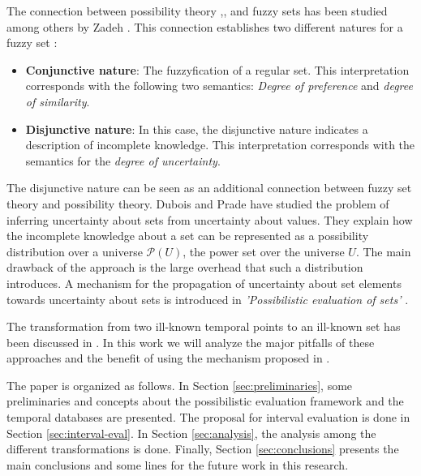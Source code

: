 \documentclass[twoside,twocolumn,a4paper]{article}
\newcommand{\Pow}{\mathcal{P}}
\begin{document}
The connection between possibility theory \cite{Zadeh78},\cite{Shackle61},\cite{Gaines75} and fuzzy sets has been studied among others by Zadeh \cite{Zadeh65}. This connection establishes two different natures for a fuzzy set \cite{Dubois97}:
\begin{itemize}
\item
\textbf{Conjunctive nature}: The fuzzyfication of a regular set. This interpretation corresponds with the following two semantics: \textit{Degree of preference} and \textit{degree of similarity}.
\item
\textbf{Disjunctive nature}: In this case, the disjunctive nature indicates a description of incomplete knowledge. This interpretation corresponds with the semantics for the \textit{degree of uncertainty}.
\end{itemize}

The disjunctive nature can be seen as an additional connection between fuzzy set theory and possibility theory. Dubois and Prade \cite{Dubois88b} have studied the problem of inferring uncertainty about sets from uncertainty about values. They explain how the incomplete knowledge about a set can be represented as a possibility distribution over a universe $\Pow \left(U \right)$, the power set over the universe $U$. The main drawback of the approach is the large overhead that such a distribution introduces.  A mechanism for the propagation of uncertainty about set elements towards uncertainty about sets is introduced in \textit{'Possibilistic evaluation of sets'} \cite{Pon11}.

The transformation from two ill-known temporal points to an ill-known set has been discussed in \cite{Garrido2009}. In this work we will analyze the major pitfalls of these approaches and the benefit of using the mechanism proposed in \cite{Pon11}.

The paper is organized as follows. In Section \ref{sec:preliminaries}, some preliminaries and concepts about the possibilistic evaluation framework and the temporal databases are presented. The proposal for interval evaluation is done in Section \ref{sec:interval-eval}. In Section \ref{sec:analysis}, the analysis among the different transformations is done. Finally, Section \ref{sec:conclusions} presents the main conclusions and some lines for the future work in this research.
\end{document}
